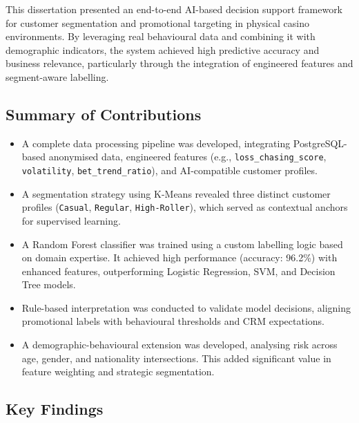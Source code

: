 \documentclass[12pt,a4paper]{report}
\begin{document}
This dissertation presented an end-to-end AI-based decision support framework for customer segmentation and promotional targeting in physical casino environments. By leveraging real behavioural data and combining it with demographic indicators, the system achieved high predictive accuracy and business relevance, particularly through the integration of engineered features and segment-aware labelling.

\subsection*{Summary of Contributions}

\begin{itemize}
    \item A complete data processing pipeline was developed, integrating PostgreSQL-based anonymised data, engineered features (e.g., \texttt{loss\_chasing\_score}, \texttt{volatility}, \texttt{bet\_trend\_ratio}), and AI-compatible customer profiles.
     \item A segmentation strategy using K-Means revealed three distinct customer profiles (\texttt{Casual}, \texttt{Regular}, \texttt{High-Roller}), which served as contextual anchors for supervised learning.
    \item A Random Forest classifier was trained using a custom labelling logic based on domain expertise. It achieved high performance (accuracy: 96.2\%) with enhanced features, outperforming Logistic Regression, SVM, and Decision Tree models.
    \item Rule-based interpretation was conducted to validate model decisions, aligning promotional labels with behavioural thresholds and CRM expectations.
    \item A demographic-behavioural extension was developed, analysing risk across age, gender, and nationality intersections. This added significant value in feature weighting and strategic segmentation.

\end{itemize}

\subsection*{Key Findings}
\end{document}
